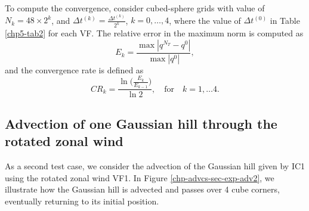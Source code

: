 To compute the convergence, consider cubed-sphere grids with value of $N_k =  48\times2^{k}$,
and $\Delta t^{(k)} = \frac{\Delta t^{(k)}}{2^k}$, $k=0, \ldots, 4$, where
the value of $\Delta t^{(0)}$ in Table \ref{chp5-tab2} for each VF.
The relative error in the maximum norm is computed as
\begin{equation}
	E_k = \frac{\max |q^{N_T} - q^0|}{\max {|q^0|}},
\end{equation}
and the convergence rate is defined as
\begin{equation*}
	CR_k = \frac{\ln{\bigg(\frac{E_{k}}{E_{k-1}}}\bigg)}{\ln 2}, \quad \text{for} \quad k = 1, \ldots 4.
\end{equation*}

\newpage
\subsection{Advection of one Gaussian hill through the rotated zonal wind}
As a second test case, we consider the advection of the Gaussian hill given by IC1 using 
the rotated zonal wind VF1.
In Figure \ref{chp-advcs-sec-exp-adv2}, we illustrate how the Gaussian hill is advected and passes over 4 cube corners, 
eventually returning to its initial position. 
